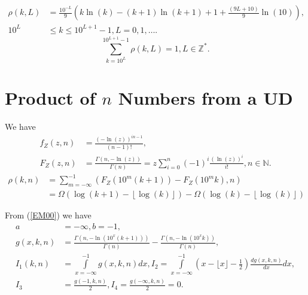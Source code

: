 \documentclass[titlepage,fleqn]{article}%
\providecommand{\U}[1]{\protect\rule{.1in}{.1in}}
\begin{document}
\begin{align*}
\rho(k,L) &  =\frac{10^{-L}}{9}\left(  k\ln(k)-(k+1)\ln(k+1)+1+\frac{\left(
9L+10\right)  }{9}\ln(10)\right)  ,\\
10^{L} &  \leq k\leq10^{L+1}-1,L=0,1,\ldots.
\end{align*}%
\[%
{\displaystyle\sum\limits_{k=10^{L}}^{10^{L+1}-1}}
\rho(k,L)=1,L\in%
\mathbb{Z}
^{\ast}.
\]


\section{Product of $n$ Numbers from a UD}%

\label{PRNUD}%


\bigskip

We have%
\begin{align*}
f_{Z}(z,n) &  =\frac{(-\ln(z))^{in-1}}{\left(  n-1\right)  !},\\
F_{Z}(z,n) &  =\frac{\Gamma(n,-\ln(z))}{\Gamma(n)}=z%
{\displaystyle\sum\limits_{i=0}^{n}}
(-1)^{i}\frac{(\ln(z))^{i}}{i!},n\in%
\mathbb{N}
.
\end{align*}%
\begin{align*}
\rho(k,n) &  =%
{\displaystyle\sum\limits_{m=-\infty}^{-1}}
\left(  F_{Z}(10^{m}(k+1))-F_{Z}(10^{m}k),n\right)  \\
&  =\Omega\left(  \log(k+1)-\left\lfloor \log(k)\right\rfloor \right)
-\Omega\left(  \log(k)-\left\lfloor \log(k)\right\rfloor \right)
\end{align*}


\bigskip From (\ref{EM00}) we have
\begin{align}
a  &  =-\infty,b=-1,\label{ProdN}\\
g(x,k,n)  &  =\frac{\Gamma(n,-\ln(10^{x}(k+1)))}{\Gamma(n)}-\frac
{\Gamma(n,-\ln(10^{x}k))}{\Gamma(n)},\nonumber\\
I_{1}(k,n)  &  =%
{\displaystyle\int\limits_{x=-\infty}^{-1}}
g(x,k,n)dx,I_{2}=%
{\displaystyle\int\limits_{x=-\infty}^{-1}}
\left(  x-\lfloor x\rfloor-\frac{1}{2}\right)  \frac{dg(x,k,n)}{dx}%
dx,\nonumber\\
I_{3}  &  =\frac{g(-1,k,n)}{2},I_{4}=\frac{g(-\infty,k,n)}{2}=0.\nonumber
\end{align}
\end{document}
